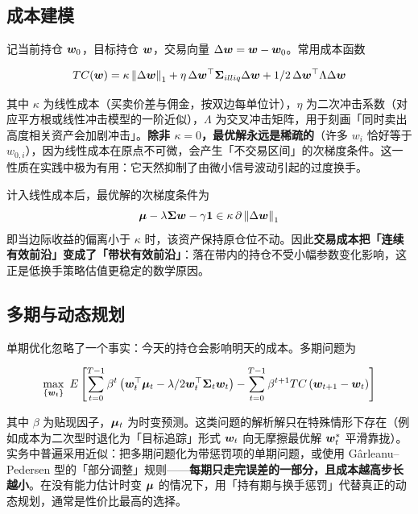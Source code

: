 \subsection{成本建模}

记当前持仓 $\bm{w}_0$，目标持仓 $\bm{w}$，交易向量 $\Delta\bm{w} = \bm{w} - \bm{w}_0$。常用成本函数

\begin{equation}\label{eq:11-tc}
  TC(\bm{w}) = \kappa\left\lVert \Delta\bm{w} \right\rVert_1 + \eta\,\Delta\bm{w}^{\top}\bm{\Sigma}_{illiq}\Delta\bm{w}
  + 1/2\,\Delta\bm{w}^{\top}\Lambda\Delta\bm{w}
\end{equation}

其中 $\kappa$ 为线性成本（买卖价差与佣金，按双边每单位计），$\eta$ 为二次冲击系数（对应平方根或线性冲击模型的一阶近似），$\Lambda$ 为交叉冲击矩阵，用于刻画「同时卖出高度相关资产会加剧冲击」。\textbf{除非 $\kappa = 0$，最优解永远是稀疏的}（许多 $w_i$ 恰好等于 $w_{0,i}$），因为线性成本在原点不可微，会产生「不交易区间」的次梯度条件。这一性质在实践中极为有用：它天然抑制了由微小信号波动引起的过度换手。

\begin{keybox}\label{key:11-tc}
计入线性成本后，最优解的次梯度条件为
\begin{equation}\label{eq:11-tc-opt}
  \bm{\mu} - \lambda\bm{\Sigma}\bm{w} - \gamma\mathbf{1} \in \kappa\,\partial\left\lVert \Delta\bm{w} \right\rVert_1
\end{equation}
即当边际收益的偏离小于 $\kappa$ 时，该资产保持原仓位不动。因此\textbf{交易成本把「连续有效前沿」变成了「带状有效前沿」}：落在带内的持仓不受小幅参数变化影响，这正是低换手策略估值更稳定的数学原因。
\end{keybox}

\subsection{多期与动态规划}

单期优化忽略了一个事实：今天的持仓会影响明天的成本。多期问题为

\begin{equation}\label{eq:11-multi}
  \max_{\{\wvec_t\}}\ \E\left[\sum_{t=0}^{T-1}\beta^{t}\left(\wvec_t^{\top}\muvec_t - \frac{\lambda}{2}\wvec_t^{\top}\Sigmamat_t\wvec_t\right) - \sum_{t=0}^{T-1}\beta^{t+1}\text{TC}\left(\wvec_{t+1} - \wvec_t\right)\right]
\end{equation}

其中 $\beta$ 为贴现因子，$\bm{\mu}_t$ 为时变预测。这类问题的解析解只在特殊情形下存在（例如成本为二次型时退化为「目标追踪」形式 $\bm{w}_t$ 向无摩擦最优解 $\bm{w}_t^{*}$ 平滑靠拢）。实务中普遍采用近似：把多期问题化为带惩罚项的单期问题，或使用 Gârleanu--Pedersen 型的「部分调整」规则——\textbf{每期只走完误差的一部分，且成本越高步长越小}。在没有能力估计时变 $\bm{\mu}$ 的情况下，用「持有期与换手惩罚」代替真正的动态规划，通常是性价比最高的选择。

